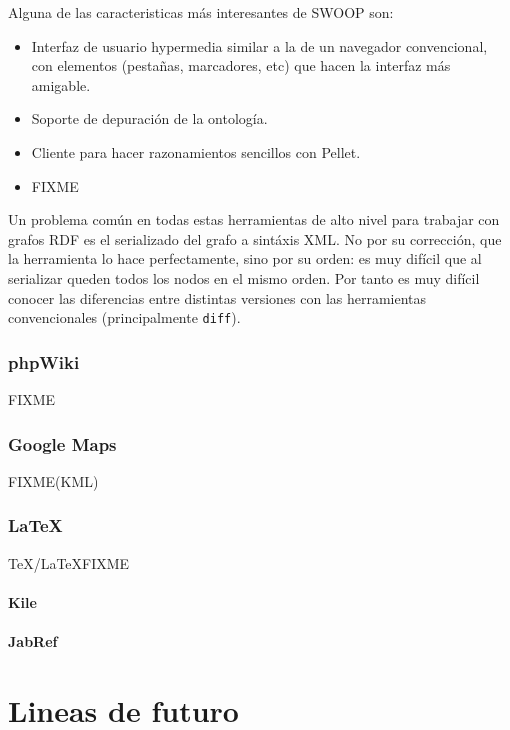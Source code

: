 Alguna de las caracteristicas más interesantes de SWOOP son:

\begin{itemize}
  \item Interfaz de usuario hypermedia similar a la de un navegador convencional, 
	con elementos (pestañas, marcadores, etc) que hacen la interfaz más 
	amigable.
  \item Soporte de depuración de la ontología.
  \item Cliente para hacer razonamientos sencillos con Pellet.
  \item FIXME
\end{itemize}

Un problema común en todas estas herramientas de alto nivel para trabajar con
grafos RDF es el serializado del grafo a sintáxis XML. No por su corrección,
que la herramienta lo hace perfectamente, sino por su orden: es muy difícil
que al serializar queden todos los nodos en el mismo orden. Por tanto es muy
difícil conocer las diferencias entre distintas versiones con las herramientas
convencionales (principalmente \texttt{diff}).

\subsubsection{phpWiki}

FIXME

\subsubsection{Google Maps}

FIXME(KML)

\subsubsection{\LaTeX}

\TeX/\LaTeX FIXME

\paragraph{Kile}

\paragraph{JabRef}

\section{Lineas de futuro}

